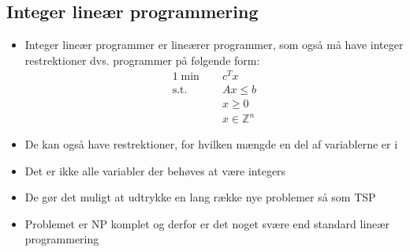 \subsection{Integer lineær programmering}
\begin{itemize}
	\item Integer lineær programmer er lineærer programmer, som også må have integer restrektioner dvs. programmer på følgende form:
   \begin{alignat*}{1}
    \min \quad  & c^Tx \\
    \text{s.t.} \quad &  Ax \leq b \\
    & x \geq 0 \\
    & x \in \mathbb Z^n
  \end{alignat*}
  \item De kan også have restrektioner, for hvilken mængde en del af variablerne er i 
  \item Det er ikke alle variabler der behøves at være integers
  \item De gør det muligt at udtrykke en lang række nye problemer så som TSP
  \item Problemet er NP komplet og derfor er det noget svære end standard lineær programmering
\end{itemize}

